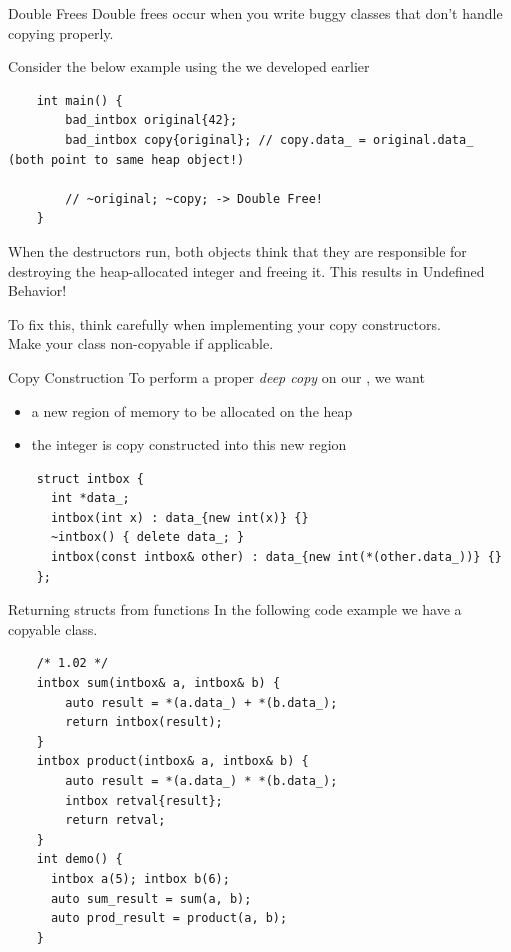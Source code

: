 \begin{frame}[fragile]{Double Frees}
  Double frees occur when you write buggy classes that don't handle copying properly.

  Consider the below example using the  we developed earlier
  \begin{verbatim}
    int main() {
        bad_intbox original{42};
        bad_intbox copy{original}; // copy.data_ = original.data_ (both point to same heap object!)
    
        // ~original; ~copy; -> Double Free!
    }
  \end{verbatim}
  When the destructors run, both objects think that they are responsible for destroying
  the heap-allocated integer and freeing it. This results in Undefined Behavior!
  
  To fix this, think carefully when implementing your copy constructors.\\
  Make your class non-copyable if applicable.
\end{frame}

\begin{frame}[fragile]{Copy Construction}
  To perform a proper \emph{deep copy} on our , we want
  \begin{itemize}
    \item a new region of memory to be allocated on the heap
    \item the  integer is copy constructed into this new region
  \end{itemize}

  \begin{verbatim}
    struct intbox {
      int *data_;
      intbox(int x) : data_{new int(x)} {}
      ~intbox() { delete data_; }
      intbox(const intbox& other) : data_{new int(*(other.data_))} {}
    };
  \end{verbatim}
\end{frame}

\begin{frame}[fragile]{Returning structs from functions}
  In the following code example we have a copyable  class.\\

  \begin{verbatim}
    /* 1.02 */
    intbox sum(intbox& a, intbox& b) {
        auto result = *(a.data_) + *(b.data_);
        return intbox(result);
    }
    intbox product(intbox& a, intbox& b) {
        auto result = *(a.data_) * *(b.data_);
        intbox retval{result};
        return retval;
    }
    int demo() {
      intbox a(5); intbox b(6);
      auto sum_result = sum(a, b);
      auto prod_result = product(a, b);
    }
  \end{verbatim}
\end{frame}

